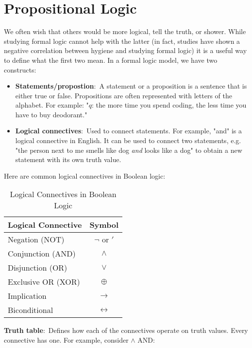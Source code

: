 \documentclass[nobib]{tufte-handout}
\newcommand{\defn}[2]{\noindent\textbf{#1}:\ #2}
\begin{document}
\pagebreak

\pagebreak 

\section{Propositional Logic}

We often wish that others would be more logical, tell the truth,
or shower. While studying formal logic cannot help with the latter
(in fact, studies have shown a negative correlation between
hygiene and studying formal logic) it is a useful way to 
define what the first two mean. In a formal logic model, we have two constructs:
\begin{itemize}
    \item \defn{Statements/propostion}{A statement or a proposition is a sentence that
    is either true or false.} Propositions are often represented 
    with letters of the alphabet. For example: "$q$: the more time
    you spend coding, the less time you have to buy deodorant."
    \item \defn{Logical connectives}{Used to connect statements.} For 
    example, "and" is a logical connective in English. It can be
    used to connect two statements, e.g. "the person next to me
    smells like dog \emph{and} looks like a dog" to obtain 
    a new statement with its own truth value. 
\end{itemize}

Here are common logical connectives in Boolean logic:
\begin{table}[h]
    \centering
    \begin{tabular}{lc}
    \toprule
    \textbf{Logical Connective} & \textbf{Symbol} \\
    \midrule
    Negation (NOT) & $\lnot$ or $'$ \\
    Conjunction (AND) & $\land$ \\
    Disjunction (OR) & $\lor$ \\
    Exclusive OR (XOR) & $\oplus$ \\
    Implication & $\rightarrow$ \\
    Biconditional & $\leftrightarrow$ \\
    \bottomrule
    \end{tabular}
    \caption{Logical Connectives in Boolean Logic}
    \label{tab:logical-connectives}
\end{table}

\defn{Truth table}{Defines how each of the
connectives operate on truth values. Every connective has one.}
For example, consider $\land$ AND:
\end{document}
